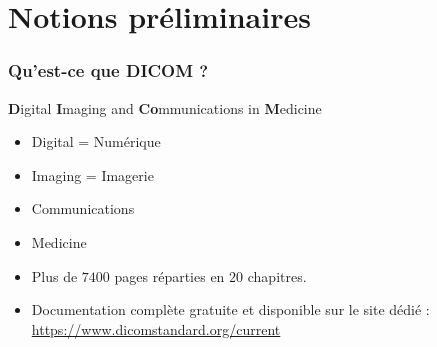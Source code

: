 \section{Notions pr\'eliminaires}

	\frame
	{
		\frametitle{Qu'est-ce que DICOM ?}
		
		\begin{block}{\textbf{D}igital \textbf{I}maging and \textbf{Co}mmunications in \textbf{M}edicine}
			\begin{itemize}
				\item< 2-> Digital = Num\'erique
		    		\item<2-> Imaging = Imagerie
		    		\item<3-> Communications
		    		\item<4-> Medicine
			\end{itemize}
		\end{block}

		\begin{itemize}
			\item<5-> Plus de $7400$ pages r\'eparties en $20$ chapitres.
			\item<6-> Documentation compl\`ete gratuite et disponible sur le site d\'edi\'e : \url{https://www.dicomstandard.org/current}	
		\end{itemize}
	}

